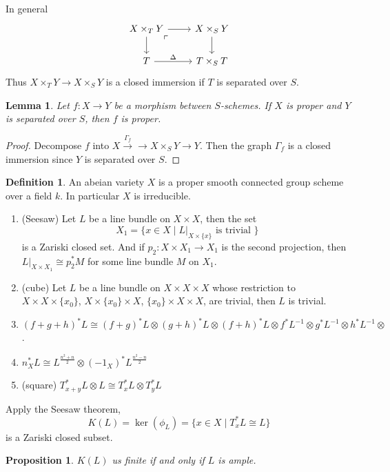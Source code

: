 \documentclass[leqno]{amsart}
\newcommand{\1}{\mathbf{1}}
\newtheorem{lem}[thm]{Lemma}
\newtheorem{prop}[thm]{Proposition}
\theoremstyle{definition}
\newtheorem{defn}[thm]{Definition}
\theoremstyle{remark}
\begin{document}
In general 
\[
	\begin{tikzcd}
		X\times_TY\arrow[r]\arrow[d]
		\arrow[dr, phantom, "\ulcorner", very near start]&
		X\times_SY\arrow[d]\\
		T\arrow[r,"\Delta"]&
		T\times_ST
	\end{tikzcd}
\]
Thus $X\times_TY\to X\times_SY$
is a closed immersion if  $T$ is separated over  $S$.
 \begin{lem}
	Let $f\colon X\to Y$
	be a morphism between  $S$-schemes.
	If  $X$ is proper and  $Y$ is separated over  $S$,
	then  $f$ is proper.
\end{lem}
\begin{proof}
	Decompose $f$ into
	$X\xrightarrow{\Gamma_f}\to X\times_SY
	\to Y$.
	Then the graph  $\Gamma_f$
	is a closed immersion since  $Y$ is separated over  $S$.
\end{proof}

\begin{defn}
	An abeian variety $X$ is a proper smooth connected
	group scheme over a field $k$.
	In particular  $X$ is irreducible.
\end{defn}
\begin{enumerate}[label=(\alph*)]
	\item (Seesaw) Let $L$ be a line bundle 
		on  $X\times X$, then the set
		 \[
			X_1=\{x\in X\mid L\vert_{X\times \{x\} }
			\text{ is trivial }\}
		\]
		is a Zariski closed set.
		And if $p_2\colon X\times X_1\to X_1$
		is the second projection,
		then  $L\vert_{X\times X_1}\cong p_2^*M$
		for some line bundle $M$ on  $X_1$.
	\item (cube) Let  $L$ be a line bundle 
		on  $X\times X\times X$ whose restriction to
		 $X\times X\times \{x_0\}$,
		 $X\times \{x_0\}\times X$,
		 $\{x_0\}\times X\times X$, are trivial,
		 then $L$ is trivial.
	 \item  $(f+g+h)^*L\cong 
	 (f+g)^*L\otimes (g+h)^*L\otimes (f+h)^*L\otimes
	 f^*L^{-1}\otimes g^*L^{-1}\otimes h^*L^{-1}\otimes $.
 \item $n_X^*L\cong L^{\frac{n^2+n}{2}}\otimes
	 (-1_X)^*L^{\frac{n^2-n}{2}}$ 
 \item (square) $T_{x+y}^*L\otimes L\cong 
	 T_x^*L\otimes T_y^*L$
\end{enumerate}
Apply the Seesaw theorem, 
\[
	K(L)=\ker(\phi_L)=
	\{x\in X\mid T_x^*L\cong L\}
\]
is a Zariski closed subset.
\begin{prop}
	$K(L)$ us finite 
	if and only if  $L$ is ample.
\end{prop}
\end{document}
